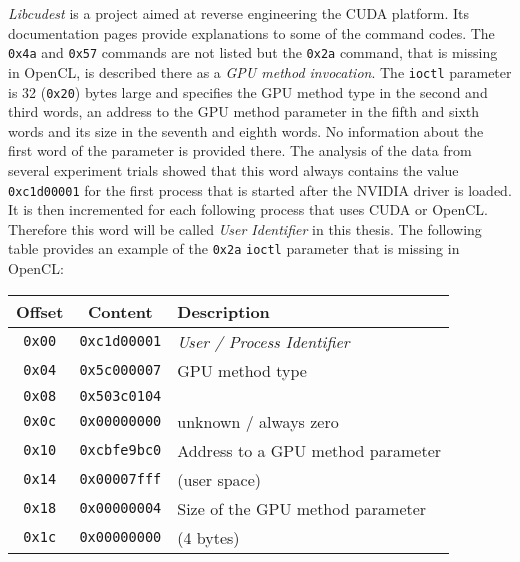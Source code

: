 \emph{Libcudest} \cite{libcudest} is a project aimed at reverse engineering the CUDA platform.
Its documentation pages provide explanations to some of the command codes.
The \texttt{0x4a} and \texttt{0x57} commands are not listed but
the \texttt{0x2a} command, that is missing in OpenCL, is described there as a \emph{GPU method invocation}.
The \texttt{ioctl} parameter is 32 (\texttt{0x20}) bytes large and specifies the GPU method type in the second and third words, an address to the GPU method parameter in the fifth and sixth words and its size in the seventh and eighth words.
No information about the first word of the parameter is provided there.
The analysis of the data from several experiment trials showed that this word always contains the value \texttt{0xc1d00001} for the first process that is started after the NVIDIA driver is loaded.
It is then incremented for each following process that uses CUDA or OpenCL.
Therefore this word will be called \emph{User Identifier} in this thesis.
The following table provides an example of the \texttt{0x2a} \texttt{ioctl} parameter that is missing in OpenCL:

\begin{center}
\begin{tabular}{| c | c | l |}
	\hline
	Offset & Content & Description \\
	\hline
	\hline
	\texttt{0x00} & \texttt{0xc1d00001} &  \emph{User / Process Identifier} \\
	\hline
	\texttt{0x04} & \texttt{0x5c000007} &  GPU method type \cite{libcudest}\\
	\texttt{0x08} & \texttt{0x503c0104} &  \\
	\hline  
	\texttt{0x0c} & \texttt{0x00000000} &  unknown / always zero\\
	\hline
	\texttt{0x10} & \texttt{0xcbfe9bc0} &  Address to a GPU method parameter \cite{libcudest}\\
	\texttt{0x14} & \texttt{0x00007fff} &  (user space)\\
	\hline
	\texttt{0x18} & \texttt{0x00000004} &  Size of the GPU method parameter \cite{libcudest}\\
	\texttt{0x1c} & \texttt{0x00000000} &  (4 bytes)\\
	\hline
\end{tabular}
\end{center}

